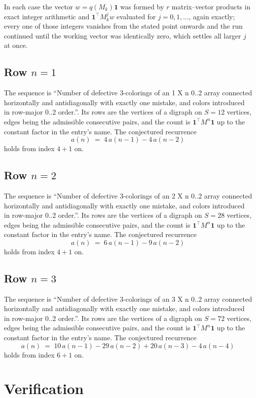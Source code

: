\documentclass[11pt,a4paper]{article}
\theoremstyle{plain}
\theoremstyle{definition}
\begin{document}
In each case the vector $w=q(M_k)\mathbf{1}$ was formed by $r$ matrix--vector products in
exact integer arithmetic and $\mathbf{1}^{\!\top}M_k^{j}w$ evaluated for $j=0,1,\dots$,
again exactly; every one of those integers vanishes from the stated point onwards and the run
continued until the working vector was identically zero, which settles all larger $j$ at once.

\subsection*{Row $n$$=1$}
The sequence is ``Number of defective 3-colorings of an 1 X n 0..2 array connected horizontally and antidiagonally with exactly one mistake, and colors introduced in row-major 0..2 order.''. Its rows are the vertices of a digraph on
$S=12$ vertices, edges being the admissible consecutive pairs, and the count is
$\mathbf{1}^{\!\top}M^{n}\mathbf{1}$ up to the constant factor in the entry's name.
The conjectured recurrence
\[
a(n)\;=\;4\,a(n-1) - 4\,a(n-2)
\]
holds from index $4+1$ on.

\subsection*{Row $n$$=2$}
The sequence is ``Number of defective 3-colorings of an 2 X n 0..2 array connected horizontally and antidiagonally with exactly one mistake, and colors introduced in row-major 0..2 order.''. Its rows are the vertices of a digraph on
$S=28$ vertices, edges being the admissible consecutive pairs, and the count is
$\mathbf{1}^{\!\top}M^{n}\mathbf{1}$ up to the constant factor in the entry's name.
The conjectured recurrence
\[
a(n)\;=\;6\,a(n-1) - 9\,a(n-2)
\]
holds from index $4+1$ on.

\subsection*{Row $n$$=3$}
The sequence is ``Number of defective 3-colorings of an 3 X n 0..2 array connected horizontally and antidiagonally with exactly one mistake, and colors introduced in row-major 0..2 order.''. Its rows are the vertices of a digraph on
$S=72$ vertices, edges being the admissible consecutive pairs, and the count is
$\mathbf{1}^{\!\top}M^{n}\mathbf{1}$ up to the constant factor in the entry's name.
The conjectured recurrence
\[
a(n)\;=\;10\,a(n-1) - 29\,a(n-2) + 20\,a(n-3) - 4\,a(n-4)
\]
holds from index $6+1$ on.

\section{Verification}
\end{document}
